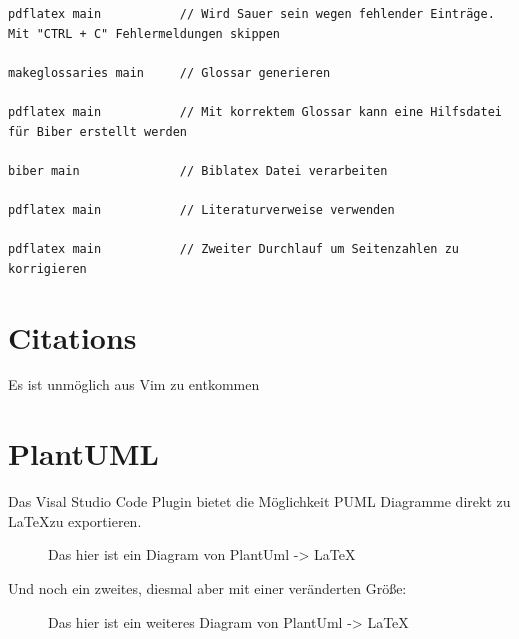 \begin{lstlisting}[caption=Kompilieren des Dokuments, label=CompileInstructions]
pdflatex main           // Wird Sauer sein wegen fehlender Einträge. Mit "CTRL + C" Fehlermeldungen skippen

makeglossaries main     // Glossar generieren

pdflatex main           // Mit korrektem Glossar kann eine Hilfsdatei für Biber erstellt werden

biber main              // Biblatex Datei verarbeiten

pdflatex main           // Literaturverweise verwenden

pdflatex main           // Zweiter Durchlauf um Seitenzahlen zu korrigieren
\end{lstlisting}

\section{Citations}
Es ist unmöglich aus Vim zu entkommen \cite{nerd_how_2012}

\section{PlantUML}
Das Visal Studio Code Plugin bietet die Möglichkeit PUML Diagramme direkt zu \LaTeX zu exportieren.

\begin{figure}[H]
    \centering
    
    \caption{Das hier ist ein Diagram von PlantUml -> \LaTeX}
\end{figure}

Und noch ein zweites, diesmal aber mit einer veränderten Größe:
\begin{figure}[H]
    \centering
    \resizebox{10cm}{!}{
        
    }
    \caption{Das hier ist ein weiteres Diagram von PlantUml -> \LaTeX}
\end{figure}